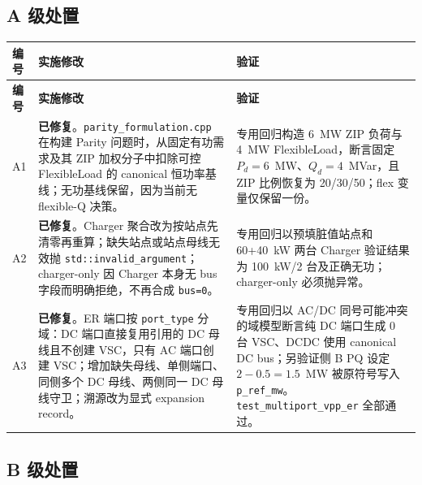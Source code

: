 \documentclass[11pt,a4paper,fontset=fandol]{ctexart}
\newcommand{\file}[1]{\texttt{#1}}
\newcommand{\fixed}{\textcolor{hygreen}{\textbf{已修复}}}
\begin{document}
\subsection{A 级处置}

\begin{longtable}{@{}p{0.7cm}p{8.2cm}p{6.2cm}@{}}
\toprule
\textbf{编号} & \textbf{实施修改} & \textbf{验证}\\
\midrule
\endfirsthead
\toprule
\textbf{编号} & \textbf{实施修改} & \textbf{验证}\\
\midrule
\endhead
A1 & \fixed{}。\file{parity\_formulation.cpp} 在构建 Parity 问题时，从固定有功需求及其 ZIP 加权分子中扣除可控 FlexibleLoad 的 canonical 恒功率基线；无功基线保留，因为当前无 flexible-Q 决策。 & 专用回归构造 6~MW ZIP 负荷与 4~MW FlexibleLoad，断言固定 $P_d=6$~MW、$Q_d=4$~MVar，且 ZIP 比例恢复为 20/30/50；flex 变量仅保留一份。\\
A2 & \fixed{}。Charger 聚合改为按站点先清零再重算；缺失站点或站点母线无效抛 \file{std::invalid\_argument}；charger-only 因 Charger 本身无 bus 字段而明确拒绝，不再合成 \file{bus=0}。 & 专用回归以预填脏值站点和 60+40~kW 两台 Charger 验证结果为 100~kW/2 台及正确无功；charger-only 必须抛异常。\\
A3 & \fixed{}。ER 端口按 \file{port\_type} 分域：DC 端口直接复用引用的 DC 母线且不创建 VSC，只有 AC 端口创建 VSC；增加缺失母线、单侧端口、同侧多个 DC 母线、两侧同一 DC 母线守卫；溯源改为显式 expansion record。 & 专用回归以 AC/DC 同号可能冲突的域模型断言纯 DC 端口生成 0 台 VSC、DCDC 使用 canonical DC bus；另验证侧 B PQ 设定 $2-0.5=1.5$~MW 被原符号写入 \file{p\_ref\_mw}。\file{test\_multiport\_vpp\_er} 全部通过。\\
\bottomrule
\end{longtable}

\subsection{B 级处置}
\end{document}
